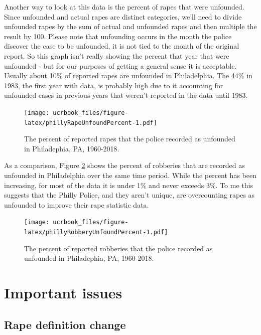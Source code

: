 \documentclass[
  12pt,
  openany]{book}
\begin{document}
Another way to look at this data is the percent of rapes that were unfounded. Since unfounded and actual rapes are distinct categories, we'll need to divide unfounded rapes by the sum of actual and unfounded rapes and then multiple the result by 100. Please note that unfounding occurs in the month the police discover the case to be unfounded, it is not tied to the month of the original report. So this graph isn't really showing the percent that year that were unfounded - but for our purposes of getting a general sense it is acceptable. Usually about 10\% of reported rapes are unfounded in Philadelphia. The 44\% in 1983, the first year with data, is probably high due to it accounting for unfounded cases in previous years that weren't reported in the data until 1983.

\begin{figure}
\centering
\texttt{[image: ucrbook\_files/figure-latex/phillyRapeUnfoundPercent-1.pdf]}
\caption{\label{fig:phillyRapeUnfoundPercent}The percent of reported rapes that the police recorded as unfounded in Philadephia, PA, 1960-2018.}
\end{figure}

As a comparison, Figure \ref{fig:phillyRobberyUnfoundPercent} shows the percent of robberies that are recorded as unfounded in Philadelphia over the same time period. While the percent has been increasing, for most of the data it is under 1\% and never exceeds 3\%. To me this suggests that the Philly Police, and they aren't unique, are overcounting rapes as unfounded to improve their rape statistic data.

\begin{figure}
\centering
\texttt{[image: ucrbook\_files/figure-latex/phillyRobberyUnfoundPercent-1.pdf]}
\caption{\label{fig:phillyRobberyUnfoundPercent}The percent of reported robberies that the police recorded as unfounded in Philadephia, PA, 1960-2018.}
\end{figure}

\hypertarget{important-issues}{%
\section{Important issues}\label{important-issues}}

\hypertarget{rape-definition-change}{%
\subsection{Rape definition change}\label{rape-definition-change}}
\end{document}
